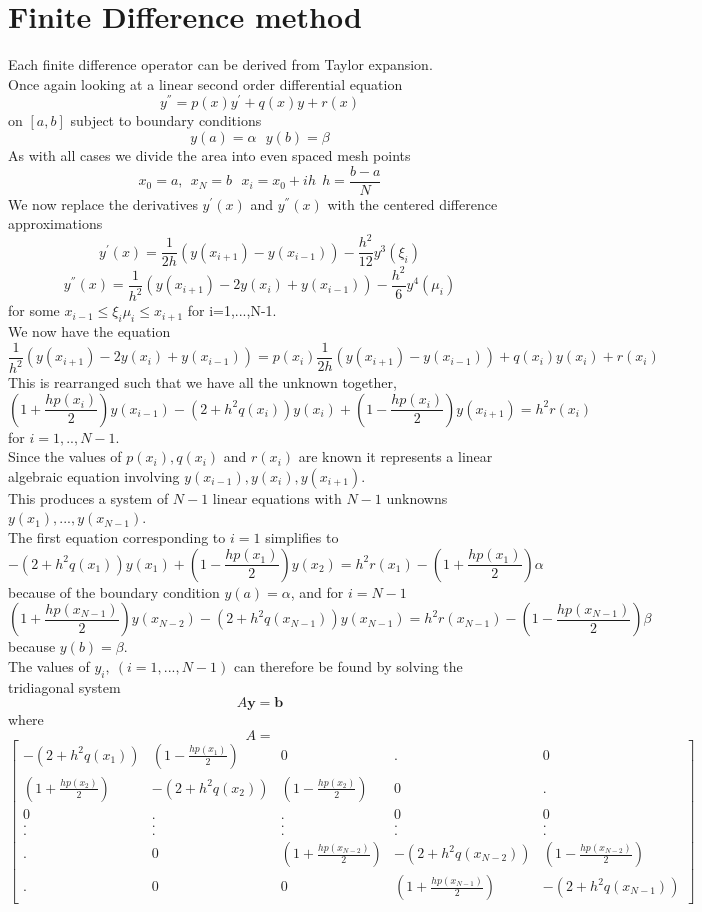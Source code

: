 \section{Finite Difference method}
Each finite difference operator can be derived from Taylor expansion.\\
Once again looking at a linear second order differential equation
\[y^{''}=p(x)y^{'}+q(x)y+r(x) \]
on $[a,b]$ subject to boundary conditions
\[ y(a)=\alpha \ \ \ y(b) =\beta \]
As with all cases we divide the area into even spaced mesh points
\[x_0=a, \ \ x_N=b \ \ \ x_i=x_0+ih \ \ h=\frac{b-a}{N} \]
We now replace the derivatives $y^{'}(x)$ and $y^{''}(x)$ with the centered difference approximations
\[y^{'}(x)=\frac{1}{2h}(y(x_{i+1})-y(x_{i-1}))-\frac{h^2}{12}y^{3}(\xi_i) \]
\[y^{''}(x)=\frac{1}{h^2}(y(x_{i+1})-2y(x_i)+y(x_{i-1}))-\frac{h^2}{6}y^{4}(\mu_i) \]
for some $x_{i-1} \leq \xi_i \mu_i \leq x_{i+1}$ for i=1,...,N-1.\\
We now have the equation
\[
\frac{1}{h^2}(y(x_{i+1})-2y(x_i)+y(x_{i-1}))=p(x_i)\frac{1}{2h}(y(x_{i+1})-y(x_{i-1}))+q(x_i)y(x_i)+r(x_i)\]
This is rearranged such that we have all the unknown together,
\[\left(1+\frac{hp(x_i)}{2} \right)y(x_{i-1})-(2+h^2q(x_i))y(x_i)+\left(1-\frac{hp(x_i)}{2} \right)y(x_{i+1})=h^2r(x_i) \]
for $i=1,..,N-1$.\\
Since the values of $p(x_i),q(x_i)$ and $r(x_i)$ are known it represents a linear
algebraic equation involving $y(x_{i-1}), y(x_{i}),y(x_{i+1})$.\\
This produces a system of $N-1$ linear equations with $N-1$ unknowns $y(x_1),...,y(x_{N-1})$.\\
The first equation corresponding to $i=1$ simplifies to 
\[-(2+h^2q(x_1))y(x_1)+\left(1-\frac{hp(x_1)}{2} \right)y(x_{2})=h^2r(x_1)-\left(1+\frac{hp(x_1)}{2} \right)\alpha \]
because of the boundary condition $y(a)=\alpha$, and for $i=N-1$
\[ \left(1+\frac{hp(x_{N-1})}{2} \right)y(x_{N-2}) -(2+h^2q(x_{N-1}))y(x_{N-1})=h^2r(x_{N-1})-\left(1-\frac{hp(x_{N-1})}{2} \right)\beta \]
because $y(b)=\beta$.\\
The values of $y_i, \ (i=1,...,N-1)$ can therefore be found by solving the tridiagonal system
\[A\mathbf{y}=\mathbf{b} \]
where
\[
A =\]
\[\begin{bmatrix}
-(2+h^2q(x_1)) & \left(1-\frac{hp(x_1)}{2}\right) & 0 &.&0 \\
 \left(1+\frac{hp(x_2)}{2}\right)&-(2+h^2q(x_2)) & \left(1-\frac{hp(x_2)}{2}\right) & 0 &.  \\
0&.&.&0&0\\
.&.&.&.&.\\
.&.&.&.&.\\
 .&0&\left(1+\frac{hp(x_{N-2})}{2}\right)&-(2+h^2q(x_{N-2})) & \left(1-\frac{hp(x_{N-2})}{2}\right) \\
 .&0&0&\left(1+\frac{hp(x_{N-1})}{2}\right)&-(2+h^2q(x_{N-1})) 
\end{bmatrix}
\]
